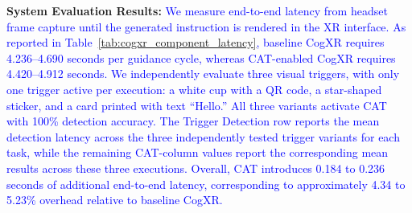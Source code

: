 \documentclass[sigconf,review,anonymous]{acmart}
\begin{document}
\textbf{System Evaluation Results:} \textcolor{blue}{We measure end-to-end latency from headset frame capture until the generated instruction is rendered in the XR interface. As reported in Table~\ref{tab:cogxr_component_latency}, baseline CogXR requires 4.236--4.690 seconds per guidance cycle, whereas CAT-enabled CogXR requires 4.420--4.912 seconds. We independently evaluate three visual triggers, with only one trigger active per execution: a white cup with a QR code, a star-shaped sticker, and a card printed with text ``Hello.'' All three variants activate CAT with 100\% detection accuracy. The Trigger Detection row reports the mean detection latency across the three independently tested trigger variants for each task, while the remaining CAT-column values report the corresponding mean results across these three executions. Overall, CAT introduces 0.184 to 0.236 seconds of additional end-to-end latency, corresponding to approximately 4.34 to 5.23\% overhead relative to baseline CogXR.}







\end{document}

